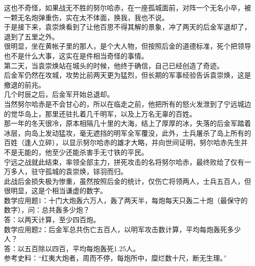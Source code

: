 \begin{multicols}{\theparacolNo}
这也不奇怪，如果战无不胜的努尔哈赤，在一座孤城面前，对阵一个无名小卒，被一颗无名炮弹重伤，实在太不体面，换我，我也不说。\\

于是接下来，袁崇焕看到了让他百思不得其解的景象，冲了两天的后金军退却了，退到了五里之外。\\

很明显，坐在黄帐子里的那人，是个大人物，但按照后金的道德标准，死个把领导也不是什么大事，这实在是件相当奇怪的事情。\\

第二天，当袁崇焕站在城头的时候，他终于确信，自己已经创造了奇迹。\\

后金军仍然在攻城，攻势比前两天更为猛烈，但长期的军事经验告诉袁崇焕，这是撤退的前兆。\\

几个时辰之后，后金军开始总退却。\\

当然努尔哈赤是不会甘心的，所以在临走之前，他把所有的怒火发泄到了宁远城边的觉华岛上，那里还驻扎着几千明军，以及上万名无辜的百姓。\\

那一年的冬天很冷，原本相隔几十里的大海，结上了厚厚的冰，失落的后金军踏着冰层，向岛上发动猛攻，毫无遮挡的明军全军覆没，此外，士兵屠杀了岛上所有的百姓（逢人立碎），以显示努尔哈赤的雄才大略，并向世间证明，努尔哈赤先生并不是无能的，他至少还能杀害手无寸铁的平民。\\

宁远之战就此结束，率领全部主力，拼死攻击的名将努尔哈赤，最终败给了仅有一万多人，驻守孤城的袁崇焕，铩羽而归。\\

此战后金损失极为惨重，虽然按照后金的统计，仅伤亡将领两人，士兵五百人，但很明显，这是个相当谦虚的数字。\\

数学应用题1：十门大炮轰六万人，轰了两天半，每炮每天只轰二十炮（最保守的数字），问：总共轰多少炮？\\

答：以两天计算，至少四百炮。\\

数学应用题2：后金军总共伤亡五百人，以明军攻击数计算，平均每炮轰死多少人？\\

答：以五百除以四百，平均每炮轰死1.25人。\\

参考史料：“红夷大炮者，周而不停，每炮所中，糜烂数十尺，断无生理。”\\


\end{multicols}
